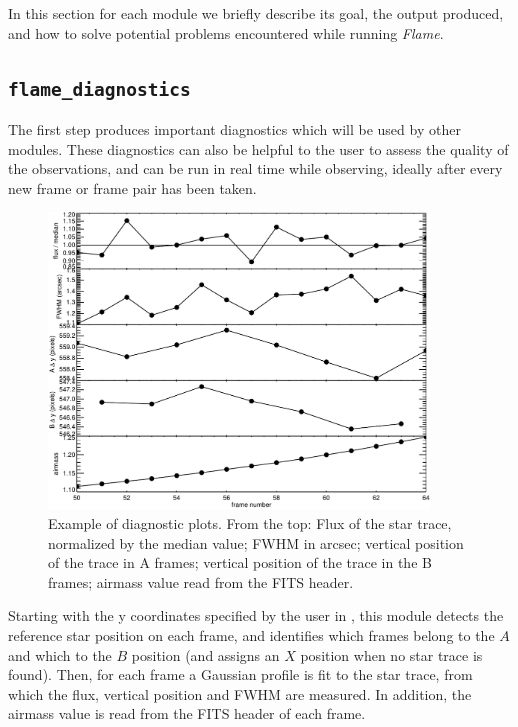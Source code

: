 \documentclass[a4paper]{article}
\newcommand{\flame}{\emph{Flame}}
\begin{document}
\begin{sloppypar}
In this section for each module we briefly describe its goal, the output produced, and how to solve potential problems encountered while running \flame.



\subsection{\texttt{flame\_diagnostics}}
\label{sec:diagnostics}

The first step produces important diagnostics which will be used by other modules. These diagnostics can also be helpful to the user to assess the quality of the observations, and can be run in real time while observing, ideally after every new frame or frame pair has been taken.

\begin{figure}[htbp]
\centering
\includegraphics[width=0.9\textwidth]{diagnostics}
\caption{Example of diagnostic plots. From the top: Flux of the star trace, normalized by the median value; FWHM in arcsec; vertical position of the trace in A frames; vertical position of the trace in the B frames; airmass value read from the FITS header.}
\label{fig:diagnostics}
\end{figure}

Starting with the y coordinates specified by the user in , this module detects the reference star position on each frame, and identifies which frames belong to the $A$ and which to the $B$ position (and assigns an $X$ position when no star trace is found). Then, for each frame a Gaussian profile is fit to the star trace, from which the flux, vertical position and FWHM are measured. In addition, the airmass value is read from the FITS header of each frame.


\end{sloppypar}
\end{document}
